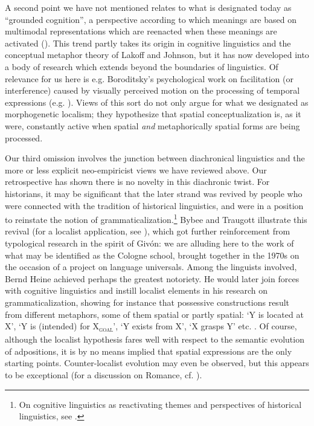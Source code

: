 \documentclass[output=paper]{langscibook}
\begin{document}
A second point we have not mentioned relates to what is designated today as “grounded cognition”, a perspective according to which meanings are based on multimodal representations which are reenacted when these meanings are activated (\citealt{barsalou_grounded_2008}). This trend partly takes its origin in cognitive linguistics and the conceptual metaphor theory of Lakoff and Johnson, but it has now developed into a body of research which extends beyond the boundaries of linguistics. Of relevance for us here is e.g. Boroditsky’s psychological work on facilitation (or interference) caused by visually perceived motion on the processing of temporal expressions (e.g. \citealt{boroditsky_does_2001}). Views of this sort do not only argue for what we designated as morphogenetic localism; they hypothesize that spatial conceptualization is, as it were, constantly active when spatial \textit{and} metaphorically spatial forms are being processed.

Our third omission involves the junction between diachronical linguistics and the more or less explicit neo-empiricist views we have reviewed above. Our retrospective has shown there is no novelty in this diachronic twist. For historians, it may be significant that the later strand was revived by people who were connected with the tradition of historical linguistics, and were in a position to reinstate the notion of grammaticalization.\footnote{On cognitive linguistics as reactivating themes and perspectives of historical linguistics, see \citet{geeraerts_theories_2010}.} Bybee and Traugott illustrate this revival (for a localist application, see \citealt{traugott_spatial_1975}), which got further reinforcement from typological research in the spirit of Givón: we are alluding here to the work of what may be identified as the Cologne school, brought together in the 1970s on the occasion of a project on language universals. Among the linguists involved, Bernd Heine achieved perhaps the greatest notoriety. He would later join forces with cognitive linguistics and instill localist elements in his research on grammaticalization, showing for instance that possessive constructions result from different metaphors, some of them spatial or partly spatial: ‘Y is located at X’, ‘Y is (intended) for X\textsubscript{\textsc{goal}}’, ‘Y exists from X’, ‘X grasps Y’ etc. \citep{heine_cognitive_1997}. Of course, although the localist hypothesis fares well with respect to the semantic evolution of adpositions, it is by no means implied that spatial expressions are the only starting points. Counter-localist evolution may even be observed, but this appears to be exceptional (for a discussion on Romance, cf. \citealt{fagard_espace_2010}).
\end{document}
